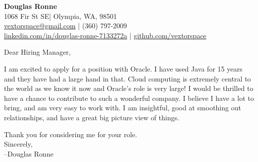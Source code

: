 \documentclass[letter,12pt]{article}
\begin{document}
\begin{center}
    {\Huge \textbf{Douglas Ronne}}\\
    \vspace{2mm}
    1068 Fir St SE| Olympia, WA, 98501\\
    \href{mailto:vextorspace@gmail.com}{vextorspace@gmail.com} | (360) 797-2009\\
    \href{www.linkedin.com/in/douglas-ronne-7133272a}{linkedin.com/in/douglas-ronne-7133272a} | \href{https://github.com/vextorspace}{github.com/vextorspace}
\end{center}

Dear Hiring Manager,

I am excited to apply for a position with Oracle. I have used Java for 15 years and they have had a large hand in that. Cloud computing is extremely central to the world as we know it now and Oracle's role is very large! I would be thrilled to have a chance to contribute to such a wonderful company. I believe I have a lot to bring, and am very easy to work with. I am insightful, good at smoothing out relationships, and have a great big picture view of things.

Thank you for considering me for your role.
\\
Sincerely,\\
--Douglas Ronne
\end{document}
